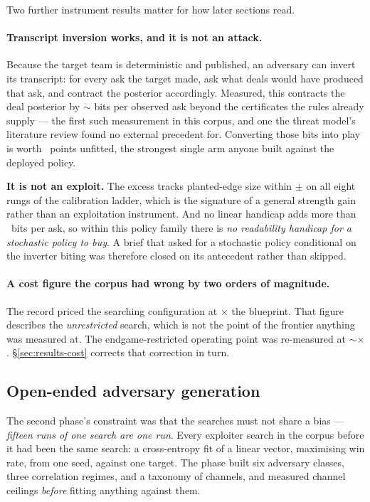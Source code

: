 Two further instrument results matter for how later sections read.

\paragraph{Transcript inversion works, and it is not an attack.} Because the target team is
deterministic and published, an adversary can invert its transcript: for every ask the target made,
ask what deals would have produced that ask, and contract the posterior accordingly. Measured, this
contracts the deal posterior by $\sim$\vsevenBitsPerAsk{} bits per observed ask beyond the
certificates the rules already supply --- the first such measurement in this corpus, and one the
threat model's literature review found no external precedent for. Converting those bits into play is
worth \vsevenInversionUnfitted{}~points unfitted, the strongest single arm anyone built against the
deployed policy.

\textbf{It is not an exploit.} The excess tracks planted-edge size within
$\pm$\vsevenInversionTrack{} on all eight rungs of the calibration ladder, which is the signature of
a general strength gain rather than an exploitation instrument. And no linear handicap adds more
than \vsevenHandicapBits{}~bits per ask, so within this policy family there is \emph{no readability
handicap for a stochastic policy to buy}. A brief that asked for a stochastic policy conditional on
the inverter biting was therefore closed on its antecedent rather than skipped.

\paragraph{A cost figure the corpus had wrong by two orders of magnitude.} The record priced the
searching configuration at \vsevenCorpusCost$\times$ the blueprint. That figure describes the
\emph{unrestricted} search, which is not the point of the frontier anything was measured at. The
endgame-restricted operating point was re-measured at $\sim$\vsevenCostRecorded$\times$.
\S\ref{sec:results-cost} corrects that correction in turn.

\subsection{Open-ended adversary generation}
\label{sec:instrument-adversaries}

The second phase's constraint was that the searches must not share a bias --- \emph{fifteen runs of
one search are one run}. Every exploiter search in the corpus before it had been the same search: a
cross-entropy fit of a linear vector, maximising win rate, from one seed, against one target. The
phase built six adversary classes, three correlation regimes, and a taxonomy of channels, and
measured channel ceilings \emph{before} fitting anything against them.

